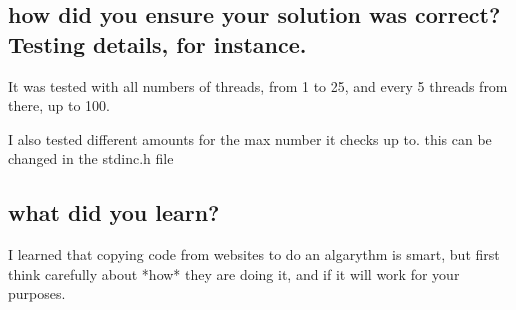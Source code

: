 \documentclass[letterpaper,10pt,titlepage]{article}
\begin{document}
\subsection{how did you ensure your solution was correct? Testing details, for instance.}

It was tested with all numbers of threads, from 1 to 25, and every 5 threads from there, up to 100.

I also tested different amounts for the max number it checks up to.  this can be changed in the stdinc.h file

\subsection{what did you learn?}

I learned that copying code from websites to do an algarythm is smart, but first think carefully about *how* they are doing it, and if it will work for your purposes.
\end{document}
